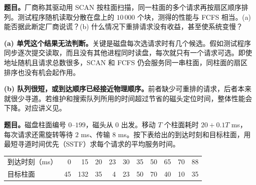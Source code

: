 
\textbf{题目。}厂商称其驱动用 SCAN 按柱面扫描，同一柱面的多个请求再按扇区顺序排列。测试程序随机读取分散在盘上的 $10\,000$ 个块，测得的性能与 FCFS 相当。(a) 能否据此断定厂商说谎？(b) 什么情况下重排请求没有收益，甚至使系统变慢？

\begin{checkedsolution}
\textbf{(a) 单凭这个结果无法判断。}关键是磁盘每次选请求时有几个候选。假如测试程序同步逐次提交读取，而且没有其他进程同时读盘，每次就只有一个请求可选。即使地址随机且请求总数很多，SCAN 和 FCFS 仍会服务同一串柱面，同柱面的扇区排序也没有机会起作用。

\textbf{(b) 队列很短，或到达顺序已经接近物理顺序。}前者缺少可重排的请求，后者本来就很少寻道。若维护和搜索队列所用的时间超过节省的磁头定位时间，整体性能会下降。对应讲义见。
\end{checkedsolution}


\textbf{题目。}磁盘柱面编号 $0$--$199$，磁头从 $0$ 出发。移动 $T$ 个柱面耗时 $20+0.1T$ ms，每次请求还需旋转等待 $2$ ms、传输 $8$ ms。按下表给出的到达时刻和目标柱面，用最短寻道时间优先（SSTF）求每个请求的平均服务时间。
\begin{center}
\small
\begin{tabular}{@{}lrrrrrrrrrr@{}}
\toprule
到达时刻（ms） & 0 & 15 & 20 & 23 & 30 & 35 & 50 & 65 & 70 & 88 \\
目标柱面       & 45 & 132 & 35 & 4 & 23 & 50 & 70 & 40 & 10 & 35 \\
\bottomrule
\end{tabular}
\end{center}


